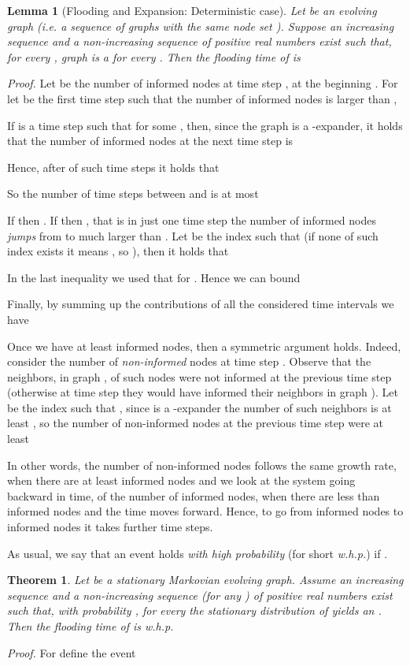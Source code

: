 \documentclass[10pt,a4paper]{article}
\newtheorem{lemma}[definition]{Lemma}
\newtheorem{theorem}[definition]{Theorem}
\newcommand{\proof}{\noindent\textit{Proof. }}
\newcommand{\qed}{\hspace{\stretch{1}}}
\begin{document}
\begin{lemma}[Flooding and Expansion: Deterministic case]\label{lemma:detbig}
Let  be an evolving graph (i.e. a sequence of graphs with the same node set ). Suppose an increasing sequence  and a non-increasing sequence  of positive real numbers exist such that, for every , graph  is a  for every . Then the flooding time of  is

\end{lemma}
\proof Let  be the number of informed nodes at time step , at the beginning . For  let  be the first time step such that the number of informed nodes is larger than ,

If  is a time step such that  for some , then, since the graph  is a -expander, it holds that the number of informed nodes at the next time step is

Hence, after  of such time steps it holds that

So the number of time steps between  and  is at most

If  then . If  then , that is in just one time step the number of informed nodes \emph{jumps} from  to  much larger than . Let  be the index such that  (if none of such index exists it means , so ), then it holds that

In the last inequality we used that  for . Hence we can bound 

Finally, by summing up the contributions of all the considered time intervals we have


\smallskip\noindent Once we have at least  informed nodes, then a symmetric argument holds. Indeed, consider the number  of \emph{non-informed} nodes at time step . Observe that the neighbors, in graph , of such nodes were not informed at the previous time step  (otherwise at time step  they would have informed their neighbors in graph ). Let  be the index such that , since  is a -expander the number of such neighbors is at least , so the number of non-informed nodes at the previous time step  were at least

In other words, the number of non-informed nodes follows the same growth rate, when there are at least  informed nodes and we look at the system going backward in time, of the number of informed nodes, when there are less than  informed nodes and the time moves forward. Hence, to go from  informed nodes to  informed nodes it takes further  time steps.
\qed

As usual, we say that an event  holds \emph{with high probability} (for short \emph{w.h.p.}) if 
 .
\begin{theorem}\label{theorem:big}
Let  be a stationary Markovian evolving graph. Assume an increasing sequence  and a non-increasing sequence  (for any ) of positive real numbers exist such that, with probability , for every  the stationary distribution of  yields an . Then the flooding time of  is w.h.p.

\end{theorem}
\proof
For  define the event
\end{document}
